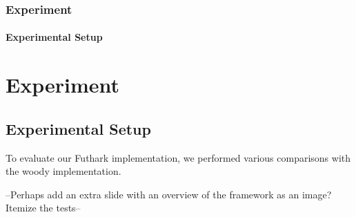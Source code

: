 \documentclass[12pt,t]{beamer}
\begin{document}
\begin{frame}
  \frametitle{Experiment}
  \framesubtitle{Experimental Setup}
\section{Experiment}
\subsection{Experimental Setup}

To evaluate our Futhark implementation, we performed various comparisons with the woody implementation.

--Perhaps add an extra slide with an overview of the framework as an image?
Itemize the tests--

%
%
%
%
%

\end{frame}
\end{document}
